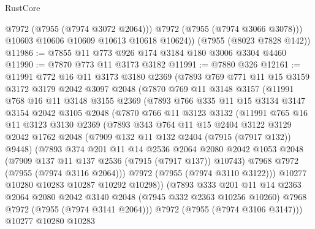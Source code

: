 \begin{lexlean}{RustCore}
\begin{coremodule}
            @7972
            (@7955 (@7974 @3072 @2064)))
          @7972
          (@7955 (@7974 @3066 @3078)))
        @10603
        @10606
        @10609
        @10613
        @10618
        @10624))
    (@7955 (@8023 @7828 @142))
@11986 := @7855 @11 @773 @926 @174 @3184 @180 @3006 @3304 @4460
@11990 := @7870 @773 @11 @3173 @3182
@11991 := @7880 @326
@12161 := @11991
    @772
    @16
    @11
    @3173
    @3180
    @2369
    (@7893
      @769
      @771
      @11
      @15
      @3159
      @3172
      @3179
      @2042
      @3097
      @2048
      (@7870
        @769
        @11
        @3148
        @3157
        (@11991
          @768
          @16
          @11
          @3148
          @3155
          @2369
          (@7893
            @766
            @335
            @11
            @15
            @3134
            @3147
            @3154
            @2042
            @3105
            @2048
            (@7870
              @766
              @11
              @3123
              @3132
              (@11991
                @765
                @16
                @11
                @3123
                @3130
                @2369
                (@7893
                  @343
                  @764
                  @11
                  @15
                  @2404
                  @3122
                  @3129
                  @2042
                  @1762
                  @2048
                  (@7909 @132 @11 @132 @2404 (@7915 (@7917 @132)) @9448)
                  (@7893
                    @374
                    @201
                    @11
                    @14
                    @2536
                    @2064
                    @2080
                    @2042
                    @1053
                    @2048
                    (@7909 @137 @11 @137 @2536 (@7915 (@7917 @137)) @10743)
                    @7968
                    @7972
                    (@7955 (@7974 @3116 @2064)))
                  @7972
                  (@7955 (@7974 @3110 @3122)))
                @10277
                @10280
                @10283
                @10287
                @10292
                @10298))
            (@7893
              @333
              @201
              @11
              @14
              @2363
              @2064
              @2080
              @2042
              @3140
              @2048
              (@7945 @332 @2363 @10256 @10260)
              @7968
              @7972
              (@7955 (@7974 @3141 @2064)))
            @7972
            (@7955 (@7974 @3106 @3147)))
          @10277
          @10280
          @10283

\end{coremodule}
\end{lexlean}
